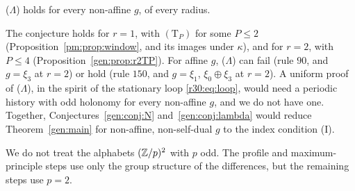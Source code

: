 \begin{conjecture}\label{gen:conj:lambda}
\textup{($\Lambda$)} holds for every non-affine $g$, of every radius.
\end{conjecture}

The conjecture holds for $r=1$, with $(\mathrm T_P)$ for some $P\le2$ (Proposition~\ref{pm:prop:window}, and its images under $\kappa$), and for $r=2$, with $P\le4$ (Proposition~\ref{gen:prop:r2TP}). For affine $g$, \textup{($\Lambda$)} can fail (rule $90$, and $g=\xi_3$ at $r=2$) or hold (rule $150$, and $g=\xi_1$, $\xi_0\oplus\xi_3$ at $r=2$). A uniform proof of \textup{($\Lambda$)}, in the spirit of the stationary loop \eqref{r30:eq:loop}, would need a periodic history with odd holonomy for every non-affine $g$, and we do not have one. Together, Conjectures~\ref{gen:conj:N} and~\ref{gen:conj:lambda} would reduce Theorem~\ref{gen:main} for non-affine, non-self-dual $g$ to the index condition \textup{(I)}.

\begin{remark}\label{gen:rem:Zp}
We do not treat the alphabets $(\mathbb{Z}/p)^2$ with $p$ odd. The profile and maximum-principle steps use only the group structure of the differences, but the remaining steps use $p=2$.
\end{remark}
